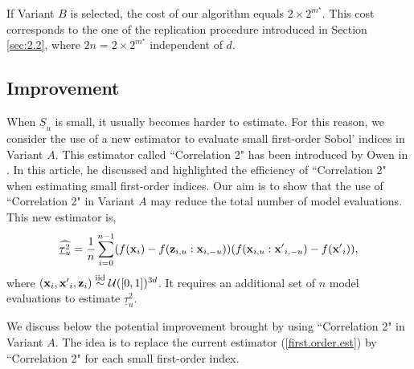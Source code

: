 If Variant $B$ is selected, the cost of our algorithm equals $2 \times 2^{m^{\star}}$. This cost corresponds to the one of the replication procedure introduced in Section \ref{sec:2.2}, where $2n=2\times 2^{m^{\star}}$ independent of $d$.

\subsection{Improvement}
\label{sec:4.2}

When $\underline{S}_u$ is small, it usually becomes harder to estimate. For this reason, we consider the use of a new estimator to evaluate small first-order Sobol' indices in Variant $A$. This estimator called ``Correlation 2" has been introduced by Owen in \cite{Owen}. In this article, he discussed and highlighted the efficiency of ``Correlation 2" when estimating small first-order indices. Our aim is to show that the use of ``Correlation 2" in Variant $A$ may reduce the total number of model evaluations. This new estimator is,
\begin{equation*}
\widehat{\underline{\tau}_u^2} = \frac{1}{n} \sum \limits_{i=0}^{n-1} (f(\boldsymbol{\mathbf{x}}_i)-f({\boldsymbol{\mathbf{z}}}_{i,u}:{\boldsymbol{\mathbf{x}}}_{i,-u}))(f(\boldsymbol{\mathbf{x}}_{i,u}:{\boldsymbol{\mathbf{x}}'}_{i,-u})-f({\boldsymbol{\mathbf{x}}'}_i)),
\end{equation*}
where $(\boldsymbol{\mathbf{x}}_i,{\boldsymbol{\mathbf{x}}'}_i, \boldsymbol{\mathbf{z}}_i) \stackrel{{\rm iid}}{\sim} \mathcal{U}([0,1])^{3d}$. It requires an additional set of $n$ model evaluations to estimate $\underline{\tau}_u^2$.
\bigskip

We discuss below the potential improvement brought by using ``Correlation 2" in Variant $A$. The idea is to replace the current estimator (\ref{first.order.est}) by  ``Correlation 2" for each small first-order index. 

